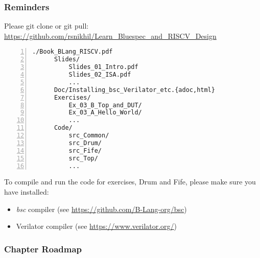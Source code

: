 

\begin{frame}[fragile]
\frametitle{Reminders}

\footnotesize

Please git clone or git pull: \url{https://github.com/rsnikhil/Learn_Bluespec_and_RISCV_Design}

\begin{Verbatim}[frame=single, numbers=left]
    ./Book_BLang_RISCV.pdf
      Slides/
          Slides_01_Intro.pdf
          Slides_02_ISA.pdf
          ...
      Doc/Installing_bsc_Verilator_etc.{adoc,html}
      Exercises/
          Ex_03_B_Top_and_DUT/
          Ex_03_A_Hello_World/
          ...
      Code/
          src_Common/
          src_Drum/
          src_Fife/
          src_Top/
          ...
\end{Verbatim}

\vspace{1ex}

To compile and run the code for exercises, Drum and Fife, please make sure you have installed:

\begin{itemize}

 \item \emph{bsc} compiler (see \url{https://github.com/B-Lang-org/bsc})

 \item Verilator compiler (see \url{https://www.verilator.org/})
\end{itemize}

\footnotesize

\end{frame}


\begin{frame}
\frametitle{Chapter Roadmap}

\footnotesize

\begin{center}
\end{center}

\end{frame}

